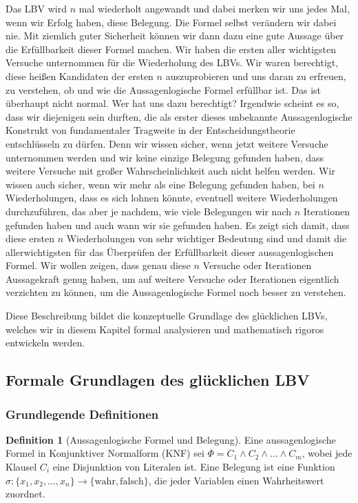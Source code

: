 ﻿\documentclass[a4paper,12pt]{article}
\theoremstyle{definition}
\newtheorem{definition}{Definition}
\begin{document}
Das LBV wird $n$ mal wiederholt angewandt und dabei merken wir uns jedes Mal, wenn wir Erfolg haben, diese Belegung. Die Formel selbst verändern wir dabei nie. Mit ziemlich guter Sicherheit können wir dann dazu eine gute Aussage über die Erfüllbarkeit dieser Formel machen. Wir haben die ersten aller wichtigsten Versuche unternommen für die Wiederholung des LBVs. Wir waren berechtigt, diese heißen Kandidaten der ersten $n$ auszuprobieren und uns daran zu erfreuen, zu verstehen, ob und wie die Aussagenlogische Formel erfüllbar ist. Das ist überhaupt nicht normal. Wer hat uns dazu berechtigt? Irgendwie scheint es so, dass wir diejenigen sein durften, die als erster dieses unbekannte Aussagenlogische Konstrukt von fundamentaler Tragweite in der Entscheidungstheorie entschlüsseln zu dürfen. Denn wir wissen sicher, wenn jetzt weitere Versuche unternommen werden und wir keine einzige Belegung gefunden haben, dass weitere Versuche mit großer Wahrscheinlichkeit auch nicht helfen werden. Wir wissen auch sicher, wenn wir mehr als eine Belegung gefunden haben, bei $n$ Wiederholungen, dass es sich lohnen könnte, eventuell weitere Wiederholungen durchzuführen, das aber je nachdem, wie viele Belegungen wir nach $n$ Iterationen gefunden haben und auch wann wir sie gefunden haben. Es zeigt sich damit, dass diese ersten $n$ Wiederholungen von sehr wichtiger Bedeutung sind und damit die allerwichtigsten für das Überprüfen der Erfüllbarkeit dieser aussagenlogischen Formel. Wir wollen zeigen, dass genau diese $n$ Versuche oder Iterationen Aussagekraft genug haben, um auf weitere Versuche oder Iterationen eigentlich verzichten zu können, um die Aussagenlogische Formel noch besser zu verstehen.

Diese Beschreibung bildet die konzeptuelle Grundlage des glücklichen LBVs, welches wir in diesem Kapitel formal analysieren und mathematisch rigoros entwickeln werden.

\subsection{Formale Grundlagen des glücklichen LBV}

\subsubsection{Grundlegende Definitionen}

\begin{definition}[Aussagenlogische Formel und Belegung]
Eine aussagenlogische Formel in Konjunktiver Normalform (KNF) sei $\Phi = C_1 \land C_2 \land \ldots \land C_m$, wobei jede Klausel $C_i$ eine Disjunktion von Literalen ist. Eine Belegung ist eine Funktion $\sigma: \{x_1, x_2, \ldots, x_n\} \to \{\text{wahr}, \text{falsch}\}$, die jeder Variablen einen Wahrheitswert zuordnet.
\end{definition}
\end{document}
